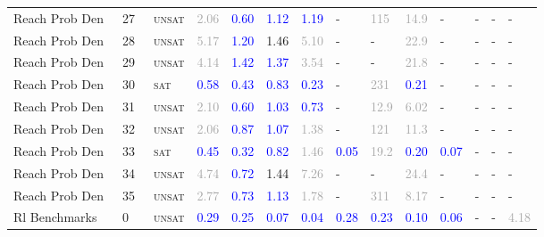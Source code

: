 \begin{center}
{\begin{longtable}{@{}llllllllllllll@{}}
Reach Prob Den~ & 27 & ~\textsc{unsat} & \textcolor{darkgray}{2.06} & \textcolor{blue}{0.60} & \textcolor{blue}{1.12} & \textcolor{blue}{1.19} & - & \textcolor{darkgray}{115} & \textcolor{darkgray}{14.9} & - & - & - & - \\
Reach Prob Den~ & 28 & ~\textsc{unsat} & \textcolor{darkgray}{5.17} & \textcolor{blue}{1.20} & \textcolor{second}{1.46} & \textcolor{darkgray}{5.10} & - & - & \textcolor{darkgray}{22.9} & - & - & - & - \\
Reach Prob Den~ & 29 & ~\textsc{unsat} & \textcolor{darkgray}{4.14} & \textcolor{blue}{1.42} & \textcolor{blue}{1.37} & \textcolor{darkgray}{3.54} & - & - & \textcolor{darkgray}{21.8} & - & - & - & - \\
Reach Prob Den~ & 30 & ~\textsc{sat} & \textcolor{blue}{0.58} & \textcolor{blue}{0.43} & \textcolor{blue}{0.83} & \textcolor{blue}{0.23} & - & \textcolor{darkgray}{231} & \textcolor{blue}{0.21} & - & - & - & - \\
Reach Prob Den~ & 31 & ~\textsc{unsat} & \textcolor{darkgray}{2.10} & \textcolor{blue}{0.60} & \textcolor{blue}{1.03} & \textcolor{blue}{0.73} & - & \textcolor{darkgray}{12.9} & \textcolor{darkgray}{6.02} & - & - & - & - \\
Reach Prob Den~ & 32 & ~\textsc{unsat} & \textcolor{darkgray}{2.06} & \textcolor{blue}{0.87} & \textcolor{blue}{1.07} & \textcolor{darkgray}{1.38} & - & \textcolor{darkgray}{121} & \textcolor{darkgray}{11.3} & - & - & - & - \\
Reach Prob Den~ & 33 & ~\textsc{sat} & \textcolor{blue}{0.45} & \textcolor{blue}{0.32} & \textcolor{blue}{0.82} & \textcolor{darkgray}{1.46} & \textcolor{blue}{0.05} & \textcolor{darkgray}{19.2} & \textcolor{blue}{0.20} & \textcolor{blue}{0.07} & - & - & - \\
Reach Prob Den~ & 34 & ~\textsc{unsat} & \textcolor{darkgray}{4.74} & \textcolor{blue}{0.72} & \textcolor{second}{1.44} & \textcolor{darkgray}{7.26} & - & - & \textcolor{darkgray}{24.4} & - & - & - & - \\
Reach Prob Den~ & 35 & ~\textsc{unsat} & \textcolor{darkgray}{2.77} & \textcolor{blue}{0.73} & \textcolor{blue}{1.13} & \textcolor{darkgray}{1.78} & - & \textcolor{darkgray}{311} & \textcolor{darkgray}{8.17} & - & - & - & - \\
\midrule
Rl Benchmarks & 0 & ~\textsc{unsat} & \textcolor{blue}{0.29} & \textcolor{blue}{0.25} & \textcolor{blue}{0.07} & \textcolor{blue}{0.04} & \textcolor{blue}{0.28} & \textcolor{blue}{0.23} & \textcolor{blue}{0.10} & \textcolor{blue}{0.06} & - & - & \textcolor{darkgray}{4.18} \\

\end{longtable}}
\end{center}
